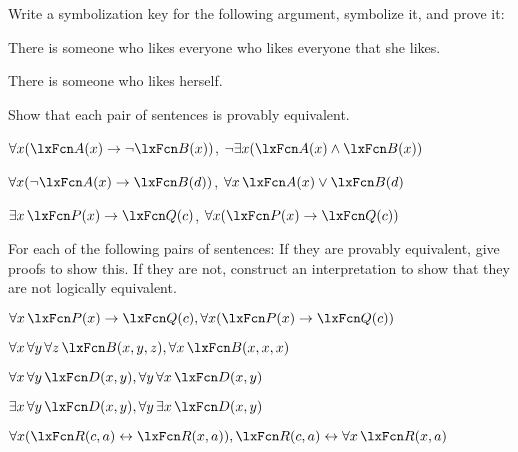 \solutions
\problempart
\label{pr.likes}
Write a symbolization key for the following argument, symbolize it, and prove it:
\begin{earg}
\item There is someone who likes everyone who likes everyone that she
likes. 
\item[\texttherefore] There is someone who likes herself.
\end{earg}


\problempart
Show that each pair of sentences is provably equivalent.
\begin{compactlist}
\item $\forall x (\atom{A}{x}\eif \enot \atom{B}{x})$, $\enot\exists x(\atom{A}{x} \eand \atom{B}{x})$
\item $\forall x (\enot\atom{A}{x}\eif \atom{B}{d})$, $\forall x\,\atom{A}{x} \eor \atom{B}{d}$
\item $\exists x\,\atom{P}{x} \eif \atom{Q}{c}$, $\forall x (\atom{P}{x} \eif \atom{Q}{c})$
\end{compactlist}

\solutions
\problempart
\label{pr.FOLequivornot}
For each of the following pairs of sentences: If they are provably equivalent, give proofs to show this. If they are not, construct an interpretation to show that they are not logically equivalent.
\begin{compactlist}
\item $\forall x\,\atom{P}{x} \eif \atom{Q}{c}, \forall x (\atom{P}{x} \eif \atom{Q}{c})$
\item $\forall x\,\forall y\, \forall z\,\atom{B}{x,y,z}, \forall x\,\atom{B}{x,x,x}$
\item $\forall x\,\forall y\,\atom{D}{x,y}, \forall y\,\forall x\,\atom{D}{x,y}$
\item $\exists x\,\forall y\,\atom{D}{x,y}, \forall y\,\exists x\,\atom{D}{x,y}$
\item $\forall x (\atom{R}{c,a} \eiff \atom{R}{x,a}), \atom{R}{c,a} \eiff \forall x\,\atom{R}{x,a}$
\end{compactlist}

